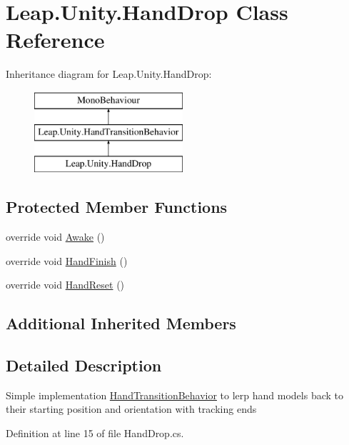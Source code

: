 \hypertarget{class_leap_1_1_unity_1_1_hand_drop}{}\section{Leap.\+Unity.\+Hand\+Drop Class Reference}
\label{class_leap_1_1_unity_1_1_hand_drop}
Inheritance diagram for Leap.\+Unity.\+Hand\+Drop\+:\begin{figure}[H]
\begin{center}
\leavevmode
\includegraphics[height=3.000000cm]{class_leap_1_1_unity_1_1_hand_drop}
\end{center}
\end{figure}
\subsection*{Protected Member Functions}
\begin{DoxyCompactItemize}
\item 
override void \mbox{\hyperlink{class_leap_1_1_unity_1_1_hand_drop_abda506fc6c05f924aa38e0011e26ffb9}{Awake}} ()
\item 
override void \mbox{\hyperlink{class_leap_1_1_unity_1_1_hand_drop_acecfd782c8bd61539dbbdd0bf1778f4b}{Hand\+Finish}} ()
\item 
override void \mbox{\hyperlink{class_leap_1_1_unity_1_1_hand_drop_aa553110438e7eaee2617cc3f9e19a7a2}{Hand\+Reset}} ()
\end{DoxyCompactItemize}
\subsection*{Additional Inherited Members}


\subsection{Detailed Description}
Simple implementation \mbox{\hyperlink{class_leap_1_1_unity_1_1_hand_transition_behavior}{Hand\+Transition\+Behavior}} to lerp hand models back to their starting position and orientation with tracking ends 

Definition at line 15 of file Hand\+Drop.\+cs.




